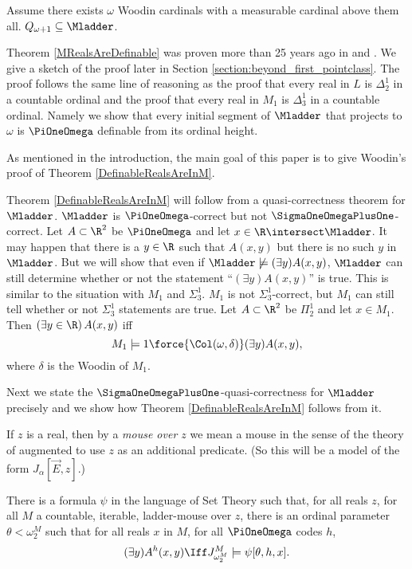 \documentclass[oneside,12pt]{amsart}
\begin{document}
\begin{theorem}
\label{DefinableRealsAreInM}
Assume there exists $\omega$ Woodin cardinals with a measurable cardinal above them all.
$Q_{\omega+1} \subseteq \Mladder$.
\end{theorem}

Theorem \ref{MRealsAreDefinable} was proven more than 25 years ago in
\cite{My_Thesis} and \cite{Mouse_Sets}. We give a sketch of the proof later
in Section \ref{section:beyond_first_pointclass}. The proof follows the same
line of reasoning as the proof that every real in $L$ is $\Delta^1_2$ in a
countable ordinal and the proof that every real in $M_1$ is $\Delta^1_3$ in
a countable ordinal. Namely we show that every initial segment of $\Mladder$
that projects to $\omega$ is $\PiOneOmega$ definable from its ordinal height.

As mentioned in the introduction, the main goal of this paper is to give Woodin's proof of Theorem \ref{DefinableRealsAreInM}.

Theorem \ref{DefinableRealsAreInM} will follow from a quasi-correctness theorem
for $\Mladder$. $\Mladder$ is $\PiOneOmega$-correct but not $\SigmaOneOmegaPlusOne$-correct.
Let $A\subset\R^2$ be $\PiOneOmega$ and let $x\in\R\intersect\Mladder$. It may
happen that there is a $y\in \R$ such that $A(x,y)$ but there is no such $y$
in $\Mladder$. But we will show that even if $\Mladder\not\models(\exists y) A(x,y)$,
$\Mladder$ can still determine whether or not the statement
``$(\exists y) A(x,y)$'' is true. This is similar to the situation with $M_1$ and
$\Sigma^1_3$. $M_1$ is not $\Sigma^1_3$-correct, but $M_1$ can still tell whether
or not $\Sigma^1_3$ statements are true. Let $A\subset\R^2$ be $\Pi^1_2$ and
let $x\in M_1$. Then $(\exists y\in\R)\, A(x,y)$ iff
$$M_1\models 1\force{\Col(\omega,\delta)} (\exists y) A(x,y),$$
where $\delta$ is the Woodin of $M_1$.

Next we state the
$\SigmaOneOmegaPlusOne$-quasi-correctness for $\Mladder$ precisely and
we show how
Theorem \ref{DefinableRealsAreInM} follows from it.

If $z$ is a real, then by a \emph{mouse over $z$} we mean a mouse in the
sense of the theory of \cite{FSIT} augmented to use $z$ as an additional predicate.
(So this will be a model of the form $J_{\alpha}[\vec{E},z]$.)

\begin{theorem}
\label{QuasiCorrectness}
There is a formula $\psi$ in the language of Set Theory such that, for all
reals $z$, for all $M$ a countable, iterable, ladder-mouse over $z$,
there is an ordinal parameter $\theta<\omega_2^M$ such that
for all reals $x$ in $M$,
for all $\PiOneOmega$ codes $h$,
$$(\exists y) A^h(x,y) \Iff J^M_{\omega_2^M} \models \psi[\theta, h,x].$$
\end{theorem}
\end{document}
